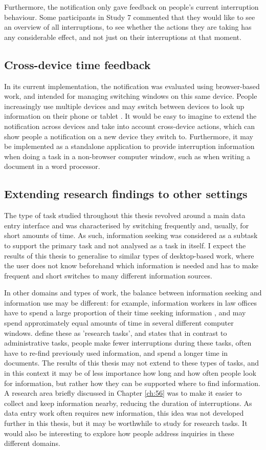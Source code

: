 Furthermore, the notification only gave feedback on people’s current interruption behaviour. Some participants in Study 7 commented that they would like to see an overview of all interruptions, to see whether the actions they are taking has any considerable effect, and not just on their interruptions at that moment.

\subsection{Cross-device time feedback}
In its current implementation, the notification was evaluated using browser-based work, and intended for managing switching windows on this same device. People increasingly use multiple devices and may switch between devices to look up information on their phone or tablet \citep{Dearman2008, Jokela2015, Murphy2016}. It would be easy to imagine to extend the notification across devices and take into account cross-device actions, which can show people a notification on a new device they switch to. Furthermore, it may be implemented as a standalone application to provide interruption information when doing a task in a non-browser computer window, such as when writing a document in a word processor.

\subsection{Extending research findings to other settings}
The type of task studied throughout this thesis revolved around a main data entry interface and was characterised by switching frequently and, usually, for short amounts of time. As such, information seeking was considered as a subtask to support the primary task and not analysed as a task in itself. 
I expect the results of this thesis to generalise to similar types of desktop-based work, where the user does not know beforehand which information is needed and has to make frequent and short switches to many different information sources. 

In other domains and types of work, the balance between information seeking and information use may be different: for example, information workers in law offices have to spend a large proportion of their time seeking information \citep{Cangiano2009}, and may spend approximately equal amounts of time in several different computer windows. \citet{Bondarenko2005} define these as 'research tasks', and states that in contrast to administrative tasks, people make fewer interruptions during these tasks, often have to re-find previously used information, and spend a longer time in documents. The results of this thesis may not extend to these types of tasks, and in this context it may be of less importance how long and how often people look for information, but rather how they can be supported where to find information. A research area briefly discussed in Chapter \ref{ch:56} was to make it easier to collect and keep information nearby, reducing the duration of interruptions. As data entry work often requires new information, this idea was not developed further in this thesis, but it may be worthwhile to study for research tasks. It would also be interesting to explore how people address inquiries in these different domains. 

